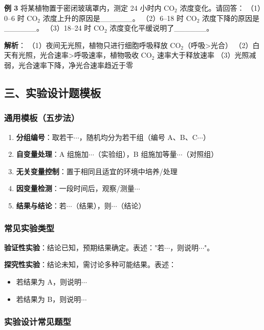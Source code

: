 \textbf{例 3} 将某植物置于密闭玻璃罩内，测定 24 小时内 CO$_2$ 浓度变化。请回答：
（1）0--6 时 CO$_2$ 浓度上升的原因是\_\_\_\_\_\_。
（2）6--18 时 CO$_2$ 浓度下降的原因是\_\_\_\_\_\_。
（3）18--24 时 CO$_2$ 浓度变化平缓说明了\_\_\_\_\_\_。

\textbf{解析}：
（1）夜间无光照，植物只进行细胞呼吸释放 CO$_2$（呼吸>光合）
（2）白天有光照，光合速率>呼吸速率，植物吸收 CO$_2$ 速率大于释放速率
（3）光照减弱，光合速率下降，净光合速率趋近于零

\subsection{三、实验设计题模板}

\subsubsection{通用模板（五步法）}

\begin{enumerate}
  \item \textbf{分组编号}：取若干$\cdots$，随机均分为若干组（编号 A、B、C$\cdots$）
  \item \textbf{自变量处理}：A 组施加$\cdots$（实验组），B 组施加等量$\cdots$（对照组）
  \item \textbf{无关变量控制}：置于相同且适宜的环境中培养/处理
  \item \textbf{因变量检测}：一段时间后，观察/测量$\cdots$
  \item \textbf{结果与结论}：若$\cdots$（结果），则$\cdots$（结论）
\end{enumerate}

\subsubsection{常见实验类型}

\textbf{验证性实验}：结论已知，预期结果确定。表述："若$\cdots$，则说明$\cdots$"。

\textbf{探究性实验}：结论未知，需讨论多种可能结果。表述：
\begin{itemize}
  \item 若结果为 A，则说明$\cdots$
  \item 若结果为 B，则说明$\cdots$
\end{itemize}

\subsubsection{实验设计常见题型}

